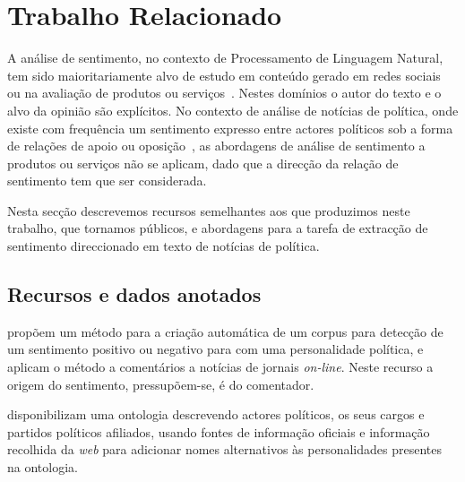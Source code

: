 \documentclass[a4paper, twocolumn, 11pt, twoside]{article}
\begin{document}
\section{Trabalho Relacionado}
\label{sec_related_work}
A análise de sentimento, no contexto de Processamento de Linguagem Natural, tem sido maioritariamente alvo de estudo em conteúdo gerado em redes sociais~\citep{10.1145/3185045} ou na avaliação de produtos ou serviços~\citep{pontiki-etal-2016-semeval}. Nestes domínios o autor do texto e o alvo da opinião são explícitos. No contexto de análise de notícias de política, onde existe com frequência um sentimento expresso entre actores políticos sob a forma de relações de apoio ou oposição~\citep{balahur2009opinion, balahur-etal-2010-sentiment}, as abordagens de análise de sentimento a produtos ou serviços não se aplicam, dado que a direcção da relação de sentimento tem que ser considerada.

Nesta secção descrevemos recursos semelhantes aos que produzimos neste trabalho, que tornamos públicos, e abordagens para a tarefa de extracção de sentimento direccionado em texto de notícias de política.

\subsection{Recursos e dados anotados}


\cite{10.1145/1651461.1651468} propõem um método para a criação automática de um corpus para detecção de um sentimento positivo ou negativo para com uma personalidade política, e aplicam o método a comentários a notícias de jornais \textit{on-line}. Neste recurso a origem do sentimento, pressupõem-se, é do comentador.

\cite{moreira2013tracking} disponibilizam uma ontologia descrevendo actores políticos, os seus cargos e partidos políticos afiliados, usando fontes de informação oficiais e informação recolhida da \textit{web} para adicionar nomes alternativos às personalidades presentes na ontologia.
\end{document}
